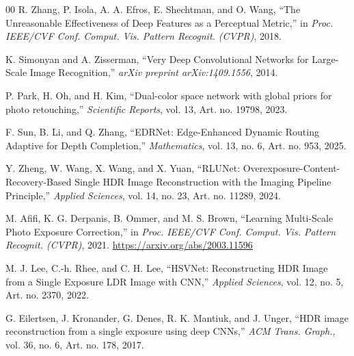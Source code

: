 \documentclass[sigconf]{acmart}
\begin{document}
\begin{thebibliography}{00}
R. Zhang, P. Isola, A. A. Efros, E. Shechtman, and O. Wang, ``The Unreasonable Effectiveness of Deep Features as a Perceptual Metric,'' in \textit{Proc. IEEE/CVF Conf. Comput. Vis. Pattern Recognit. (CVPR)}, 2018.

K. Simonyan and A. Zisserman, ``Very Deep Convolutional Networks for Large-Scale Image Recognition,'' \textit{arXiv preprint arXiv:1409.1556}, 2014.

P. Park, H. Oh, and H. Kim, ``Dual-color space network with global priors for photo retouching,'' \textit{Scientific Reports}, vol. 13, Art. no. 19798, 2023.

F. Sun, B. Li, and Q. Zhang, ``EDRNet: Edge-Enhanced Dynamic Routing Adaptive for Depth Completion,'' \textit{Mathematics}, vol. 13, no. 6, Art. no. 953, 2025.

Y. Zheng, W. Wang, X. Wang, and X. Yuan, ``RLUNet: Overexposure-Content-Recovery-Based Single HDR Image Reconstruction with the Imaging Pipeline Principle,'' \textit{Applied Sciences}, vol. 14, no. 23, Art. no. 11289, 2024.

M. Afifi, K. G. Derpanis, B. Ommer, and M. S. Brown, ``Learning Multi-Scale Photo Exposure Correction,'' in \textit{Proc. IEEE/CVF Conf. Comput. Vis. Pattern Recognit. (CVPR)}, 2021. \url{https://arxiv.org/abs/2003.11596}

M. J. Lee, C.-h. Rhee, and C. H. Lee, ``HSVNet: Reconstructing HDR Image from a Single Exposure LDR Image with CNN,'' \textit{Applied Sciences}, vol. 12, no. 5, Art. no. 2370, 2022.

G. Eilertsen, J. Kronander, G. Denes, R. K. Mantiuk, and J. Unger, ``HDR image reconstruction from a single exposure using deep CNNs,'' \textit{ACM Trans. Graph.}, vol. 36, no. 6, Art. no. 178, 2017.

\end{thebibliography}
\end{document}

